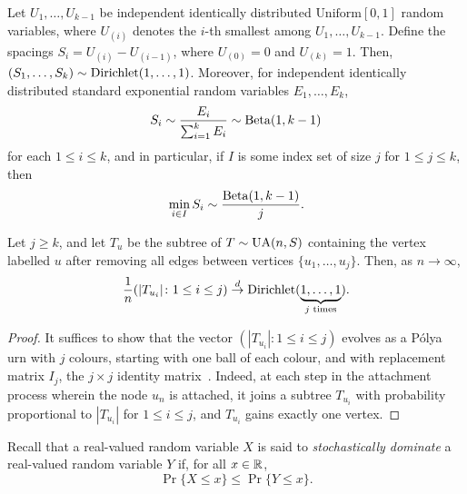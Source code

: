 \begin{lem}
  Let $U_1, \dots, U_{k - 1}$ be independent identically distributed
  $\text{Uniform}[0, 1]$ random variables, where $U_{(i)}$ denotes the
  $i$-th smallest among $U_1, \dots, U_{k - 1}$. Define the spacings
  $S_i = U_{(i)} - U_{(i - 1)}$, where $U_{(0)} = 0$ and
  $U_{(k)} = 1$. Then,
  $(S_1, \dots, S_k) \sim \operatorname{Dirichlet}(1, \dots, 1)$. Moreover, for
  independent identically distributed standard exponential random
  variables $E_1, \dots, E_k$,
  \[
    S_i \sim \frac{E_i}{\sum_{i = 1}^k E_i} \sim\operatorname{Beta}(1, k - 1)
  \]
  for each $1 \le i \le k$, and in particular, if $I$ is some index
  set of size $j$ for $1 \le j \le k$, then
  \[
    \min_{i \in I} S_i \sim \frac{\operatorname{Beta}(1, k - 1)}{j} .
  \]
\end{lem}

\begin{lem}
  Let $j \ge k$, and let $T_u$ be the subtree of $T \sim \operatorname{UA}(n, S)$
  containing the vertex labelled $u$ after removing all edges between
  vertices $\{u_1, \dots, u_j\}$. Then, as $n \to \infty$,
  \[
    \frac{1}{n} (|T_{u_i}| \colon 1 \le i \le j) \overset{d}{\to} \operatorname{Dirichlet}(\underbrace{1, \dots, 1}_{\text{$j$ times}}) .
  \]
\end{lem}
\begin{proof}
  It suffices to show that the vector
  $(|T_{u_i}| \colon 1 \le i \le j)$ evolves as a P\'{o}lya urn with
  $j$ colours, starting with one ball of each colour, and with
  replacement matrix $I_j$, the $j \times j$ identity
  matrix~\cite{blackwell}. Indeed, at each step in the attachment
  process wherein the node $u_n$ is attached, it joins a subtree
  $T_{u_i}$ with probability proportional to $|T_{u_i}|$ for
  $1 \le i \le j$, and $T_{u_i}$ gains exactly one vertex.
\end{proof}

Recall that a real-valued random variable $X$ is said to
\emph{stochastically dominate} a real-valued random variable $Y$ if,
for all $x \in \mathbb{R}$,
\[
  \Pr\{X \le x\} \le \Pr\{Y \le x\} .
\]

